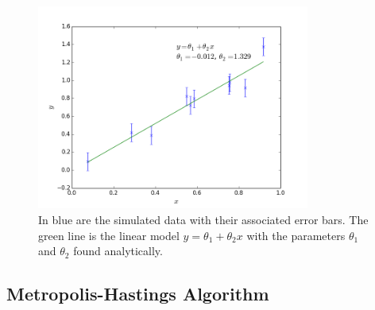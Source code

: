 \documentclass[a4paper,11pt,twoside]{article}
\begin{document}
\begin{figure}[!ht]
	\centering
	\includegraphics[width=0.8\textwidth]{2ddata.png}
	\caption{In blue are the simulated data with their associated
	error bars. The green line is the linear model $y = \theta_1 + \theta_2
	x$ with the parameters $\theta_1$ and $\theta_2$ found analytically.}
	\label{fig:model}
\end{figure}

\subsection{Metropolis-Hastings Algorithm} 
\end{document}

